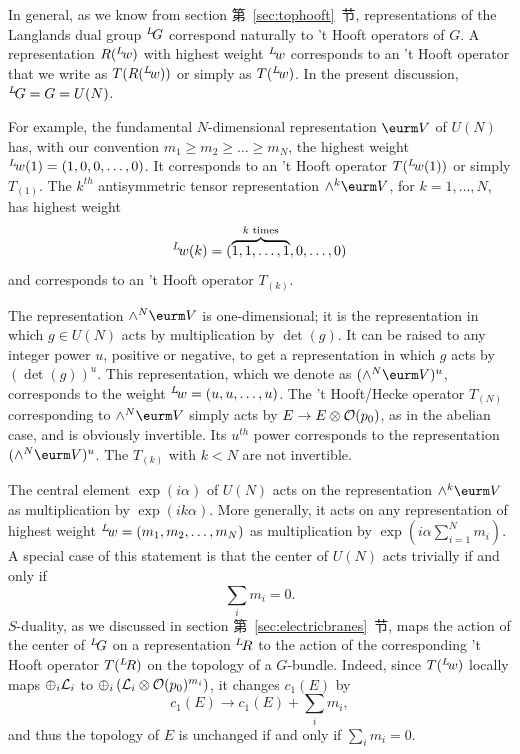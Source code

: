 \par{}

In general, as we know from section 第~\ref{sec:tophooft}~节, representations of
the Langlands dual group $^L\negthinspace G$ correspond naturally
to 't Hooft operators of $G$. A representation $R(^L\negthinspace
w)$ with highest weight $^L\negthinspace w$ corresponds to an 't
Hooft operator that we write as $T(R(^L\negthinspace w))$ or
simply as $T(^L\negthinspace w)$. In the present discussion,
$^L\negthinspace G=G=U(N)$.

For example, the fundamental $N$-dimensional representation $\VV$
of $U(N)$ has, with our convention $m_1\geq m_2\geq \dots\geq
m_N$, the highest weight $^L\negthinspace w(1)=(1,0,0,\dots,0)$.
It corresponds to an 't Hooft operator $T(^L\negthinspace w(1))$
or simply $T_{(1)}$. The $k^{th}$ antisymmetric tensor
representation $\wedge^k\VV$, for $k=1,\dots,N$, has highest
weight %
\setcounter{equation}{12}
\begin{equation}\label{eq:nyto}
^L\negthinspace
w(k)=(\overbrace{1,1,\dots,1}^{\text {$k$ times}},0,\dots,0)
\end{equation}
 and
corresponds to an 't Hooft operator $T_{(k)}$.

The representation $\wedge^N\VV$ is one-dimensional; it is the
representation in which $g\in U(N)$ acts by multiplication by
$\det(g)$.  It can be raised to any integer power $u$, positive or
negative, to get a representation in which $g$ acts by
$(\det(g))^u$. This representation, which we denote as
$(\wedge^N\VV)^u$, corresponds to the weight $^L\negthinspace
w=(u,u,\dots,u)$. The 't Hooft/Hecke operator $T_{(N)}$
corresponding to $\wedge^N\VV$ simply acts by $E\to E\otimes {\cal
O}(p_0)$, as in the abelian case, and is obviously invertible. Its
$u^{th}$ power corresponds to the representation
$(\wedge^N\VV)^u$.  The $T_{(k)}$ with $k<N$ are not invertible.

The central element $\exp(i\alpha)$ of $U(N)$ acts on the
representation $\wedge^k\VV$ as multiplication by
$\exp(ik\alpha)$. More generally, it acts on any representation of
highest weight $^L\negthinspace w=(m_1,m_2,\dots,m_N)$ as
multiplication by $\exp(i\alpha\sum_{i=1}^Nm_i)$. A special case
of this statement is that the center of $U(N)$ acts trivially if
and only if %
\setcounter{equation}{13}
\begin{equation}\label{eq:hoty}
\sum_im_i=0.
\end{equation}
 $S$-duality, as we discussed
in section 第~\ref{sec:electricbranes}~节, maps the action of the center of
$^L\negthinspace G$ on a representation $^L\negthinspace R$ to the
action of the corresponding 't Hooft operator $T(^L\negthinspace
R)$ on the topology of a $G$-bundle.  Indeed, since
$T(^L\negthinspace w)$ locally maps $\oplus_i{\cal L}_i$ to
$\oplus_i\left({\cal L}_i\otimes {\cal O}(p_0)^{m_i}\right)$, it
changes $c_1(E)$ by %
\begin{equation*}
\tag*{(9.15)}
c_1(E)\to c_1(E)+\sum_im_i,
\end{equation*}
 and
thus the topology of $E$ is unchanged if and only if
$\sum_im_i=0$.

